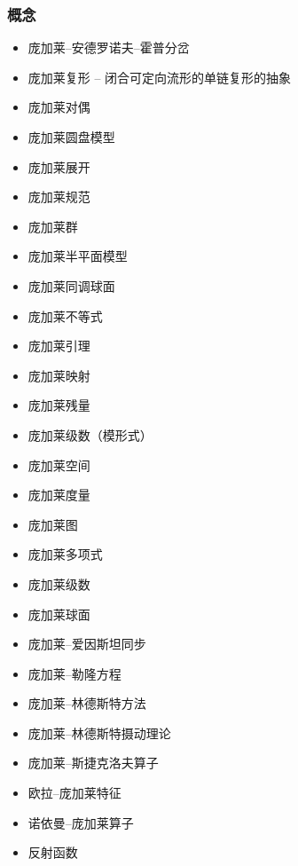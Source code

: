 \subsubsection{概念}
\begin{itemize}
\item 庞加莱–安德罗诺夫–霍普分岔  
\item 庞加莱复形 – 闭合可定向流形的单链复形的抽象  
\item 庞加莱对偶  
\item 庞加莱圆盘模型  
\item 庞加莱展开  
\item 庞加莱规范  
\item 庞加莱群  
\item 庞加莱半平面模型  
\item 庞加莱同调球面  
\item 庞加莱不等式  
\item 庞加莱引理  
\item 庞加莱映射  
\item 庞加莱残量  
\item 庞加莱级数（模形式）  
\item 庞加莱空间  
\item 庞加莱度量  
\item 庞加莱图  
\item 庞加莱多项式  
\item 庞加莱级数  
\item 庞加莱球面  
\item 庞加莱–爱因斯坦同步  
\item 庞加莱–勒隆方程  
\item 庞加莱–林德斯特方法  
\item 庞加莱–林德斯特摄动理论  
\item 庞加莱–斯捷克洛夫算子  
\item 欧拉–庞加莱特征  
\item 诺依曼–庞加莱算子  
\item 反射函数  
\end{itemize}
